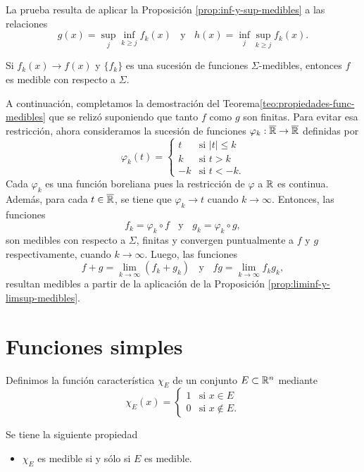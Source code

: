 La prueba resulta de aplicar la Proposici\'on \ref{prop:inf-y-sup-medibles}
a las relaciones 
\[
g(x)=\sup\limits_{j} \inf\limits_{k\geq j} f_k(x)
\;\;\mbox{ y }\;\;
h(x)=\inf\limits_{j}\sup\limits_{k \geq j} f_k(x).
\]

\begin{corolario}{}
Si $f_k(x) \to f(x)$ y $\{f_k\}$ es una sucesi\'on de funciones $\Sigma$-medibles, entonces $f$ es medible con respecto a $\Sigma$.
\end{corolario}

A continuaci\'on, completamos la demostraci\'on del Teorema\ref{teo:propiedades-func-medibles} que se reliz\'o suponiendo
que tanto $f$ como $g$ son finitas. 
Para evitar esa restricci\'on, ahora consideramos la sucesi\'on de funciones $\varphi_k:\overline{\mathbb{R}} \to \overline{\mathbb{R}}$ definidas por
\[
\varphi_k(t)=
\left\{
\begin{array}{rl}
   t  &  \mbox{si } |t|\leq k \\
   k  &  \mbox{si } t>k\\
   -k &  \mbox{si } t<-k.
\end{array}
\right.
\]
Cada $\varphi_k$ es una funci\'on boreliana pues la restricci\'on de $\varphi$ a $\mathbb{R}$ es continua. Adem\'as, para cada $t\in \overline{\mathbb{R}}$, 
se tiene que $\varphi_k \to t$ cuando $k \to \infty$. Entonces, las funciones
\[
f_k=\varphi_k \circ f \;\;\mbox{ y }
\;\;
g_k=\varphi_k \circ g,
\]
son medibles con respecto a $\Sigma$, finitas y convergen puntualmente a $f$ y $g$ respectivamente, cuando $k  \to \infty$. Luego, las funciones 
\[
f+g=\lim\limits_{k \to \infty} (f_k +g_k)
\;\;\mbox{ y }\;\;
fg=\lim\limits_{k \to \infty} f_kg_k,
\]
resultan medibles a partir de la aplicaci\'on de la Proposici\'on \ref{prop:liminf-y-limsup-medibles}.

\section{Funciones simples}
Definimos la funci\'on caracter\'istica  $\chi_E$ de un conjunto $E \subset \mathbb{R}^n$ mediante
\[
\chi_E(x)=
\left\{
\begin{array}{ll}
   1  & \mbox{si } x \in E \\
   0  & \mbox{si } x \notin E.
\end{array}
\right.
\]

Se tiene la siguiente propiedad
\begin{itemize}
    \item $\chi_E$ es medible  si y s\'olo si $E$ es medible.
\end{itemize}


